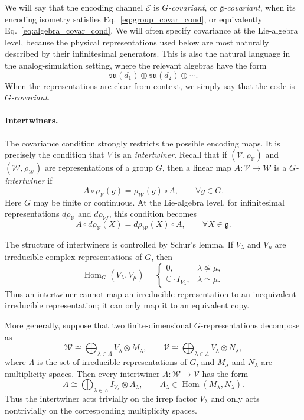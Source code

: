 \documentclass[10pt,twocolumn,superscriptaddress,aps,amsmath,amssymb,citeautoscript,floatfix,prx,longbibliography]{revtex4-2}
\newcounter{alg}
\theoremstyle{plain}
\theoremstyle{plain}
\theoremstyle{plain}
\theoremstyle{plain}
\theoremstyle{plain}
\theoremstyle{plain}
\begin{document}
We will say that the encoding channel $\mathcal E$ is \textit{$G$-covariant}, or \textit{$\mathfrak g$-covariant}, when its encoding isometry satisfies Eq.~\eqref{eq:group_covar_cond}, or equivalently Eq.~\eqref{eq:algebra_covar_cond}. We will often specify covariance at the Lie-algebra level, because the physical representations used below are most naturally described by their infinitesimal generators. This is also the natural language in the analog-simulation setting, where the relevant algebras have the form
$$
\mathfrak{su}(d_1)
\oplus
\mathfrak{su}(d_2)
\oplus
\cdots .
$$
When the representations are clear from context, we simply say that the code is \textit{$G$-covariant}.

\paragraph{Intertwiners.}

The covariance condition strongly restricts the possible encoding maps. It is precisely the condition that $V$ is an \textit{intertwiner}. Recall that if $(\mathcal V,\rho_{\mathcal V})$ and $(\mathcal W,\rho_{\mathcal W})$ are representations of a group $G$, then a linear map $A:\mathcal V\to\mathcal W$ is a \textit{$G$-intertwiner} if
\begin{equation}\label{eq:intertwiner_def}
A\circ\rho_{\mathcal V}(g)
=
\rho_{\mathcal W}(g)\circ A,
\qquad
\forall g\in G .
\end{equation}
Here $G$ may be finite or continuous. At the Lie-algebra level, for infinitesimal representations $d\rho_{\mathcal V}$ and $d\rho_{\mathcal W}$, this condition becomes
$$
A\circ d\rho_{\mathcal V}(X)
=
d\rho_{\mathcal W}(X)\circ A,
\qquad
\forall X\in\mathfrak g .
$$

The structure of intertwiners is controlled by Schur's lemma. If $V_\lambda$ and $V_\mu$ are irreducible complex representations of $G$, then
$$
\operatorname{Hom}_G(V_\lambda,V_\mu)
=
\begin{cases}
0, & \lambda\not\simeq\mu,\\
\mathbb C\cdot I_{V_\lambda}, & \lambda\simeq\mu .
\end{cases}
$$
Thus an intertwiner cannot map an irreducible representation to an inequivalent irreducible representation; it can only map it to an equivalent copy.

More generally, suppose that two finite-dimensional $G$-representations decompose as
$$
\mathcal W
\cong
\bigoplus_{\lambda\in\Lambda}
V_\lambda\otimes M_\lambda,
\qquad
\mathcal V
\cong
\bigoplus_{\lambda\in\Lambda}
V_\lambda\otimes N_\lambda,
$$
where $\Lambda$ is the set of irreducible representations of $G$, and $M_\lambda$ and $N_\lambda$ are multiplicity spaces. Then every intertwiner $A:\mathcal W\to\mathcal V$ has the form
\begin{equation}\label{eq:intertwiner_decomp}
A
\cong
\bigoplus_{\lambda\in\Lambda}
I_{V_\lambda}\otimes A_\lambda,
\qquad
A_\lambda\in\operatorname{Hom}(M_\lambda,N_\lambda).
\end{equation}
Thus the intertwiner acts trivially on the irrep factor $V_\lambda$ and only acts nontrivially on the corresponding multiplicity spaces.
\end{document}
